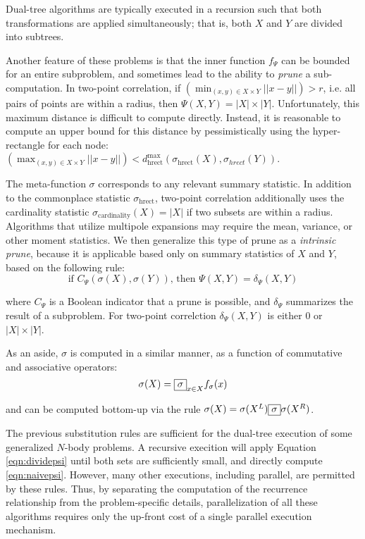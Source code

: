 \documentclass[times, 10pt,twocolumn]{article}
\DeclareMathOperator{\cardinality}{cardinality}
\DeclareMathOperator{\hrect}{hrect}
\newcommand{\kdleft}{^L}
\newcommand{\kdright}{^R}
\newcommand{\allpsi}{\Psi}
\newcommand{\fpsi}{f_{\Psi}}
\newcommand{\canprunepsi}{C_{\Psi}}
\newcommand{\deltapsi}{\delta_{\Psi}}
\newcommand{\Opsigma}{\fbox{$\sigma$}}
\newcommand{\opsigma}{\fbox{$\sigma$}}
\newcommand{\fsigma}{f_{\sigma}}
\begin{document}
Dual-tree algorithms are typically executed in a recursion such that both transformations are applied simultaneously; that is, both $X$ and $Y$ are divided into subtrees.

Another feature of these problems is that the inner function $\fpsi$ can be bounded for an entire subproblem, and sometimes lead to the ability to {\it prune} a sub-computation.
In two-point correlation, if $\left(\min_{(x, y) \in X \times Y} ||x - y||\right) > r$, i.e. all pairs of points are within a radius, then $\allpsi(X, Y) = |X| \times |Y|$.
Unfortunately, this maximum distance is difficult to compute directly.
Instead, it is reasonable to compute an upper bound for this distance by pessimistically using the hyper-rectangle for each node: $\left(\max_{(x, y) \in X \times Y} ||x - y||\right) < d^{\max}_{\hrect}(\sigma_{\hrect}(X), \sigma_{hrect}(Y))$.

The meta-function $\sigma$ corresponds to any relevant summary statistic.
In addition to the commonplace statistic $\sigma_{\hrect}$, two-point correlation additionally uses the cardinality statistic $\sigma_{\cardinality}(X) = |X|$ if two subsets are within a radius.
Algorithms that utilize multipole expansions may require the mean, variance, or other moment statistics.
We then generalize this type of prune as a {\it intrinsic prune}, because it is applicable based only on summary statistics of $X$ and $Y$, based on the following rule:
\begin{equation}
\text{if } \canprunepsi(\sigma(X), \sigma(Y)) \text{, then } \allpsi(X, Y) = \deltapsi(X, Y)
\label{eqn:intrinsic}
\end{equation}

\noindent where $\canprunepsi$ is a Boolean indicator that a prune is possible, and $\deltapsi$ summarizes the result of a subproblem.
For two-point correlction $\deltapsi(X, Y)$ is either $0$ or $|X| \times |Y|$.

As an aside, $\sigma$ is computed in a similar manner, as a function of commutative and associative operators:
\begin{equation}
\sigma(X) = \Opsigma_{x \in X} \fsigma(x)
\label{eqn:defsigma}
\end{equation}

\noindent and can be computed bottom-up via the rule $\sigma(X) = \sigma(X\kdleft) \opsigma \sigma(X\kdright)$.

\noindent The previous substitution rules are sufficient for the dual-tree execution of some generalized $N$-body problems.
A recursive execition will apply Equation \ref{eqn:dividepsi} until both sets are sufficiently small, and directly compute \ref{eqn:naivepsi}.
However, many other executions, including parallel, are permitted by these rules.
Thus, by separating the computation of the recurrence relationship from the problem-specific details, parallelization of all these algorithms requires only the up-front cost of a single parallel execution mechanism.
\end{document}
